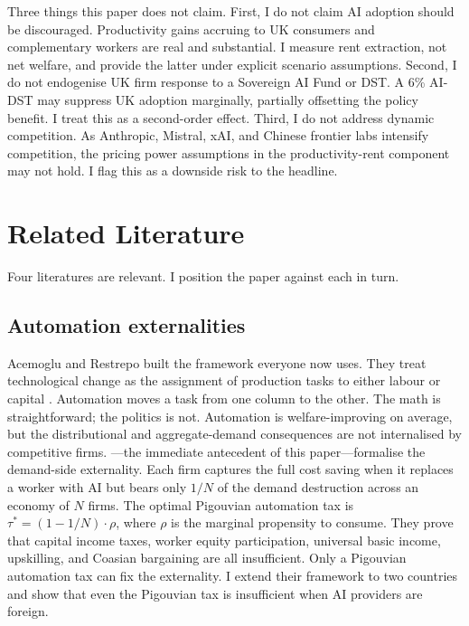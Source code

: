 \documentclass[11pt,letterpaper]{article}
\theoremstyle{remark}
\begin{document}
Three things this paper does not claim. First, I do not claim {AI} adoption should be discouraged. Productivity gains accruing to {UK} consumers and complementary workers are real and substantial. I measure rent extraction, not net welfare, and provide the latter under explicit scenario assumptions. Second, I do not endogenise {UK} firm response to a Sovereign {AI} Fund or {DST}. A 6\% {AI}-{DST} may suppress {UK} adoption marginally, partially offsetting the policy benefit. I treat this as a second-order effect. Third, I do not address dynamic competition. As {Anthropic}, {Mistral}, {xAI}, and Chinese frontier labs intensify competition, the pricing power assumptions in the productivity-rent component may not hold. I flag this as a downside risk to the headline.

\section{Related Literature}

Four literatures are relevant. I position the paper against each in turn.

\subsection{Automation externalities}

Acemoglu and Restrepo built the framework everyone now uses. They treat technological change as the assignment of production tasks to either labour or capital \citep{acemoglu_restrepo_2018, acemoglu_restrepo_2019, acemoglu_restrepo_2022}. Automation moves a task from one column to the other. The math is straightforward; the politics is not. Automation is welfare-improving on average, but the distributional and aggregate-demand consequences are not internalised by competitive firms. \citet{hemenway_falk_tsoukalas_2026}---the immediate antecedent of this paper---formalise the demand-side externality. Each firm captures the full cost saving when it replaces a worker with {AI} but bears only $1/N$ of the demand destruction across an economy of $N$ firms. The optimal Pigouvian automation tax is $\tau^* = (1 - 1/N) \cdot \rho$, where $\rho$ is the marginal propensity to consume. They prove that capital income taxes, worker equity participation, universal basic income, upskilling, and Coasian bargaining are all insufficient. Only a Pigouvian automation tax can fix the externality. I extend their framework to two countries and show that even the Pigouvian tax is insufficient when {AI} providers are foreign.
\end{document}
